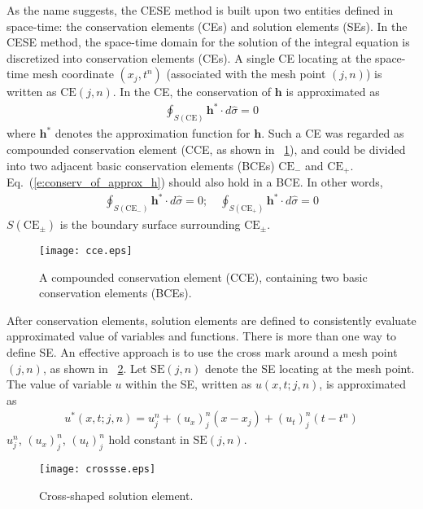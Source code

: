 \documentclass{turgon}
\begin{document}
As the name suggests, the CESE method is built upon two entities defined in
space-time: the conservation elements (CEs) and solution elements (SEs).  In
the CESE method, the space-time domain for the solution of the integral
equation is discretized into conservation elements (CEs).  A single CE locating
at the space-time mesh coordinate $(x_j, t^n)$ (associated with the mesh point
$(j,n)$) is written as $\mathrm{CE}(j,n)$.  In the CE, the conservation of
$\mathbf{h}$ is approximated as
\begin{align}
  \oint_{S(\mathrm{CE})}\mathbf{h}^*\cdot d\hat{\sigma} = 0
  \label{e:conserv_of_approx_h}
\end{align}
where $\mathbf{h}^*$ denotes the approximation function for $\mathbf{h}$.  Such
a CE was regarded as compounded conservation element (CCE, as shown in
\figurename~\ref{f:cce}), and could be divided into two adjacent basic
conservation elements (BCEs) $\mathrm{CE}_-$ and $\mathrm{CE}_+$.
Eq.~(\ref{e:conserv_of_approx_h}) should also hold in a BCE.  In other words,
\begin{align*}
  \oint_{S(\mathrm{CE}_-)}\mathbf{h}^*\cdot d\hat{\sigma} = 0; \quad
  \oint_{S(\mathrm{CE}_+)}\mathbf{h}^*\cdot d\hat{\sigma} = 0
\end{align*}
$S(\mathrm{CE}_{\pm})$ is the boundary surface surrounding $\mathrm{CE}_{\pm}$.

\begin{figure}[htbp]
\centering
  \texttt{[image: cce.eps]}
  \caption{A compounded conservation element (CCE), containing two basic
  conservation elements (BCEs).}
  \label{f:cce}
\end{figure}

After conservation elements, solution elements are defined to consistently
evaluate approximated value of variables and functions.  There is more than one
way to define SE.  An effective approach is to use the cross mark around a mesh
point $(j,n)$, as shown in \figurename~\ref{f:crossse}.  Let $\mathrm{SE}(j,n)$
denote the SE locating at the mesh point.  The value of variable $u$ within the
SE, written as $u(x,t;j,n)$, is approximated as
\begin{align*}
  u^*(x,t;j,n) = u_j^n + (u_x)_j^n(x-x_j) + (u_t)_j^n(t-t^n)
\end{align*}
$u_j^n$, $(u_x)_j^n$, $(u_t)_j^n$ hold constant in $\mathrm{SE}(j,n)$.

\begin{figure}[hbtp]
  \centering
  \texttt{[image: crossse.eps]}
  \caption{Cross-shaped solution element.}
  \label{f:crossse}
\end{figure}
\end{document}
